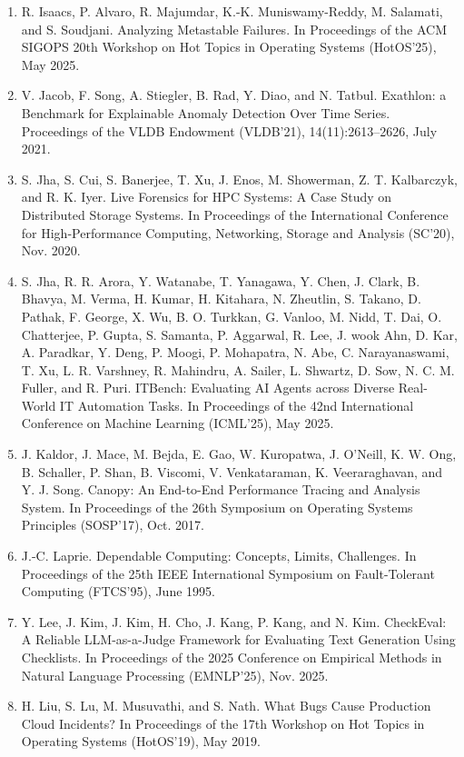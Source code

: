 \documentclass[11pt,UTF8,fontset=fandol]{ctexart}
\begin{document}
\begin{enumerate}[leftmargin=2.2em,labelsep=0.4em,itemsep=0.15em]
\item R. Isaacs, P. Alvaro, R. Majumdar, K.-K. Muniswamy-Reddy, M. Salamati, and S. Soudjani. Analyzing Metastable Failures. In Proceedings of the ACM SIGOPS 20th Workshop on Hot Topics in Operating Systems (HotOS'25), May 2025.
\item V. Jacob, F. Song, A. Stiegler, B. Rad, Y. Diao, and N. Tatbul. Exathlon: a Benchmark for Explainable Anomaly Detection Over Time Series. Proceedings of the VLDB Endowment (VLDB'21), 14(11):2613--2626, July 2021.
\item S. Jha, S. Cui, S. Banerjee, T. Xu, J. Enos, M. Showerman, Z. T. Kalbarczyk, and R. K. Iyer. Live Forensics for HPC Systems: A Case Study on Distributed Storage Systems. In Proceedings of the International Conference for High-Performance Computing, Networking, Storage and Analysis (SC'20), Nov. 2020.
\item S. Jha, R. R. Arora, Y. Watanabe, T. Yanagawa, Y. Chen, J. Clark, B. Bhavya, M. Verma, H. Kumar, H. Kitahara, N. Zheutlin, S. Takano, D. Pathak, F. George, X. Wu, B. O. Turkkan, G. Vanloo, M. Nidd, T. Dai, O. Chatterjee, P. Gupta, S. Samanta, P. Aggarwal, R. Lee, J. wook Ahn, D. Kar, A. Paradkar, Y. Deng, P. Moogi, P. Mohapatra, N. Abe, C. Narayanaswami, T. Xu, L. R. Varshney, R. Mahindru, A. Sailer, L. Shwartz, D. Sow, N. C. M. Fuller, and R. Puri. ITBench: Evaluating AI Agents across Diverse Real-World IT Automation Tasks. In Proceedings of the 42nd International Conference on Machine Learning (ICML'25), May 2025.
\item J. Kaldor, J. Mace, M. Bejda, E. Gao, W. Kuropatwa, J. O'Neill, K. W. Ong, B. Schaller, P. Shan, B. Viscomi, V. Venkataraman, K. Veeraraghavan, and Y. J. Song. Canopy: An End-to-End Performance Tracing and Analysis System. In Proceedings of the 26th Symposium on Operating Systems Principles (SOSP'17), Oct. 2017.
\item J.-C. Laprie. Dependable Computing: Concepts, Limits, Challenges. In Proceedings of the 25th IEEE International Symposium on Fault-Tolerant Computing (FTCS'95), June 1995.
\item Y. Lee, J. Kim, J. Kim, H. Cho, J. Kang, P. Kang, and N. Kim. CheckEval: A Reliable LLM-as-a-Judge Framework for Evaluating Text Generation Using Checklists. In Proceedings of the 2025 Conference on Empirical Methods in Natural Language Processing (EMNLP'25), Nov. 2025.
\item H. Liu, S. Lu, M. Musuvathi, and S. Nath. What Bugs Cause Production Cloud Incidents? In Proceedings of the 17th Workshop on Hot Topics in Operating Systems (HotOS'19), May 2019.

\end{enumerate}
\end{document}
